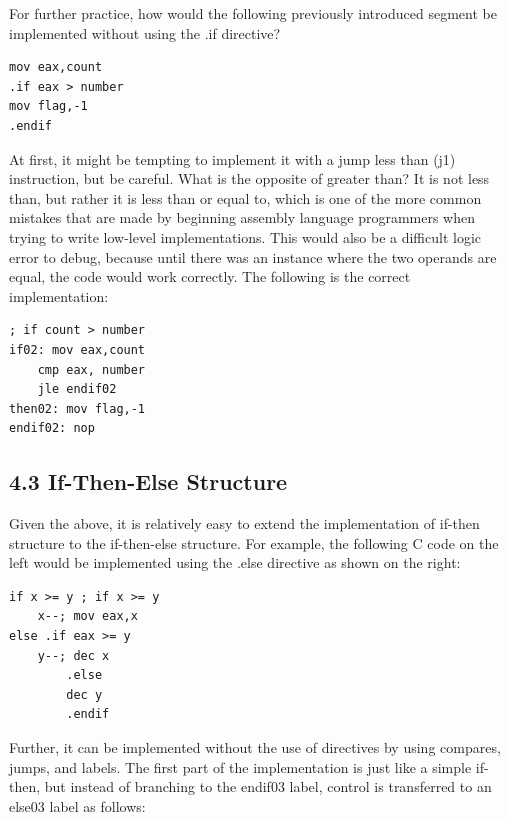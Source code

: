 \documentclass[10pt]{book}
\begin{document}
For further practice, how would the following previously introduced segment be implemented without using the .if directive?


\begin{verbatim}
mov eax,count
.if eax > number
mov flag,-1
.endif
\end{verbatim}

At first, it might be tempting to implement it with a jump less than (j1) instruction, but be careful. What is the opposite of greater than? It is not less than, but rather it is less than or equal to, which is one of the more common mistakes that are made by beginning assembly language programmers when trying to write low-level implementations. This would also be a difficult logic error to debug, because until there was an instance where the two operands are equal, the code would work correctly. The following is the correct implementation:

\begin{verbatim}
; if count > number
if02: mov eax,count
    cmp eax, number
    jle endif02
then02: mov flag,-1
endif02: nop
\end{verbatim}

\subsection*{4.3 If-Then-Else Structure}
Given the above, it is relatively easy to extend the implementation of if-then structure to the if-then-else structure. For example, the following C code on the left would be implemented using the .else directive as shown on the right:

\begin{verbatim}
if x >= y ; if x >= y
    x--; mov eax,x
else .if eax >= y
    y--; dec x
        .else
        dec y
        .endif
\end{verbatim}

Further, it can be implemented without the use of directives by using compares, jumps, and labels. The first part of the implementation is just like a simple if-then, but instead of branching to the endif03 label, control is transferred to an else03 label as follows:
\end{document}

